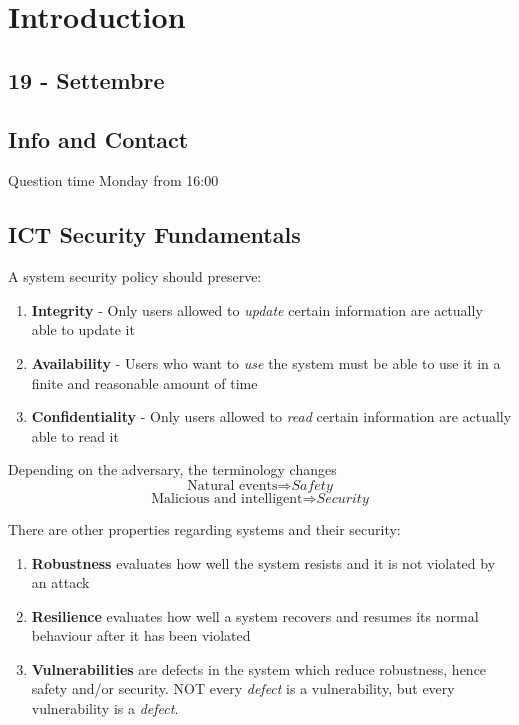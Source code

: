 \chapter{Introduction}
\section*{19 - Settembre}
\section{Info and Contact}


Question time Monday from 16:00

\section{ICT Security Fundamentals}
A system security policy should preserve:
\begin{enumerate}
    \item \textbf{Integrity} - Only users allowed to \textit{update} certain information are actually able to update it
    \item \textbf{Availability} - Users who want to \textit{use} the system must be able to use it in a finite and reasonable amount of time
    \item \textbf{Confidentiality} - Only users allowed to \textit{read} certain information are actually able to read it
\end{enumerate}

Depending on the adversary, the terminology changes
\[\text{Natural events} \Rightarrow \textit{Safety}\]
\[\text{Malicious and intelligent} \Rightarrow \textit{Security}\]

There are other properties regarding systems and their security:
\begin{enumerate}
    \item \textbf{Robustness} evaluates how well the system resists and it is not violated by an attack
    \item \textbf{Resilience} evaluates how well a system recovers and resumes its normal behaviour after it has been violated
    \item \textbf{Vulnerabilities} are defects in the system which reduce robustness, hence safety and/or security. \nl
    NOT every \textit{defect} is a vulnerability,
    but every vulnerability is a \textit{defect}.
\end{enumerate}


